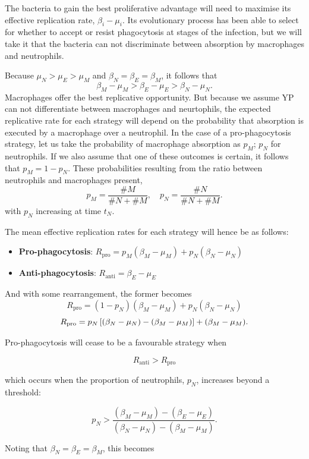 The bacteria to gain the best proliferative advantage will need to maximise its effective replication rate, $\beta_i - \mu_i$. Its evolutionary process has been able to select for whether to accept or resist phagocytosis at stages of the infection, but we will take it that the bacteria can not discriminate between absorption by macrophages and neutrophils. 


Because  $\mu_N > \mu_E > \mu_M$ and $\beta_N = \beta _E = \beta_M$, it follows that
$$\beta_M -  \mu_M > \beta_E -  \mu_E >  \beta_N - \mu_N.$$
Macrophages offer the best replicative opportunity. But because we assume YP can not differentiate between macrophages and neurtophils, the expected replicative rate for each strategy will depend on the probability that absorption is executed by a macrophage over a neutrophil. In the case of a pro-phagocytosis strategy, let us take the probability of macrophage absorption as $p_M$; $p_N$ for neutrophils. If we also assume that one of these outcomes is certain, it follows that $p_M = 1 - p_N$. These probabilities resulting from the ratio between neutrophils and macrophages present, 
$$p_M = \frac{\# M}{ \#N + \#M}, \quad p_N = \frac{\# N}{ \#N + \#M}.$$
with $p_N$ increasing at time $t_N$. \par
The mean effective replication rates for each strategy will hence be as follows:

\begin{itemize}
\item \textbf{Pro-phagocytosis}: $R_{\text{pro}} = p_M(\beta_M -  \mu_M) + p_N (\beta_N - \mu_N)$
\item \textbf{Anti-phagocytosis}: $ R_{\text{anti}}  = \beta_E -  \mu_E $ 
\end{itemize}
And with some rearrangement, the former becomes
$$ R_{\text{pro}} =(1-p_N)(\beta_M -  \mu_M) + p_N (\beta_N - \mu_N)$$
$$R_{\text{pro}} =p_N \left[ (\beta_N - \mu_N)  - (\beta_M -  \mu_M)\right]  +     (\beta_M -  \mu_M).$$

\noindent
Pro-phagocytosis will cease to be a favourable strategy when 

$$R_{\text{anti}} > R_{\text{pro}}$$ 

\noindent
which occurs when the proportion of neutrophils, $p_N$, increases beyond a threshold: 

$$p_N > \frac{ (\beta_M -  \mu_M)  -  (\beta_E -  \mu_E) }{   (\beta_N - \mu_N)    -   (\beta_M -  \mu_M) } .$$

\noindent
Noting that $\beta_N = \beta _E = \beta_M$, this becomes

